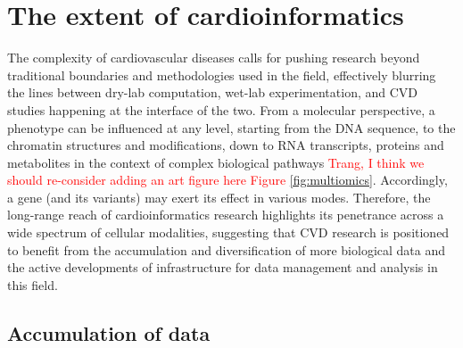 \documentclass[letter]{bioinfo}
\newcommand{\comment}[1]{\textcolor{red}{#1}}
\begin{document}
	
	\section*{The extent of cardioinformatics}
	
	
	The complexity of cardiovascular diseases calls for pushing research beyond traditional boundaries and methodologies used in the field, effectively blurring the lines between dry-lab computation, wet-lab experimentation, and CVD studies happening at the interface of the two. From a molecular perspective, a phenotype can be influenced at any level, starting from the DNA sequence, to the chromatin structures and modifications, down to RNA transcripts, proteins and metabolites in the context of complex biological pathways \comment{Trang, I think we should re-consider adding an art figure here Figure \ref{fig:multiomics}}. Accordingly, a gene (and its variants) may exert its effect in various modes.  Therefore, the long-range reach of cardioinformatics research highlights its penetrance across a wide spectrum of cellular modalities, suggesting that CVD research is positioned to benefit from the accumulation and diversification of more biological data and the active developments of infrastructure for data management and analysis in this field.
	
	\subsection*{Accumulation of data}
\end{document}
